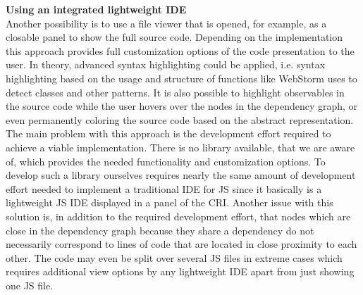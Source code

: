 \noindent\textbf{Using an integrated lightweight IDE}\\
Another possibility is to use a file viewer that is opened, for example, as a closable panel to show the full source code. Depending on the implementation this approach provides full customization options of the code presentation to the user. In theory, advanced syntax highlighting could be applied, i.e. syntax highlighting based on the usage and structure of functions like WebStorm uses to detect classes and other patterns. It is also possible to highlight observables in the source code while the user hovers over the nodes in the dependency graph, or even permanently coloring the source code based on the abstract representation. The main problem with this approach is the development effort required to achieve a viable implementation. There is no library available, that we are aware of, which provides the needed functionality and customization options. To develop such a library ourselves requires nearly the same amount of development effort needed to implement a traditional IDE for JS since it basically is a lightweight JS IDE displayed in a panel of the CRI. Another issue with this solution is, in addition to the required development effort, that nodes which are close in the dependency graph because they share a dependency do not necessarily correspond to lines of code that are located in close proximity to each other. The code may even be split over several JS files in extreme cases which requires additional view options by any lightweight IDE apart from just showing one JS file.\\

